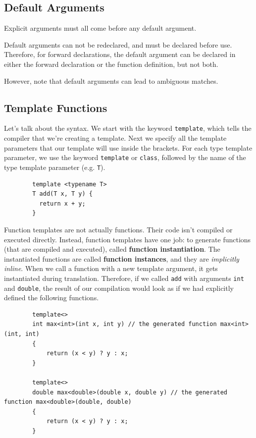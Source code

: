 \documentclass{article}
\newcounter{definition}[section]
\newcounter{code}[section]
\begin{document}
  \subsection{Default Arguments} 

    Explicit arguments must all come before any default argument. 

    Default arguments can not be redeclared, and must be declared before use. Therefore, for forward declarations, the default argument can be declared in either the forward declaration or the function definition, but not both.   

    However, note that default arguments can lead to ambiguous matches. 

  \subsection{Template Functions}

    \begin{definition}
      \label{def:template-functions}
      Let's talk about the syntax. We start with the keyword \texttt{template}, which tells the compiler that we're creating a template. Next we specify all the template parameters that our template will use inside the brackets. For each type template parameter, we use the keyword \texttt{template} or \texttt{class}, followed by the name of the type template parameter (e.g. \texttt{T}). 
      \begin{lstlisting}
        template <typename T> 
        T add(T x, T y) {
          return x + y; 
        } 
      \end{lstlisting}
      Function templates are not actually functions. Their code isn't compiled or executed directly. Instead, function templates have one job: to generate functions (that are compiled and executed), called \textbf{function instantiation}. The instantiated functions are called \textbf{function instances}, and they are \textit{implicitly inline}. When we call a function with a new template argument, it gets instantiated during translation. Therefore, if we called \texttt{add} with arguments \texttt{int} and \texttt{double}, the result of our compilation would look as if we had explicitly defined the following functions. 
      \begin{lstlisting}
        template<>
        int max<int>(int x, int y) // the generated function max<int>(int, int)
        {
            return (x < y) ? y : x;
        }

        template<>
        double max<double>(double x, double y) // the generated function max<double>(double, double)
        {
            return (x < y) ? y : x;
        }
      \end{lstlisting}
    \end{definition}
\end{document}
